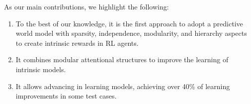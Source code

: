 As our main contributions, we highlight the following:

\begin{enumerate}
    \item To the best of our knowledge, it is the first approach to adopt a predictive world model with sparsity, independence, modularity, and hierarchy aspects to create intrinsic rewards in RL agents.
    \item It combines modular attentional structures to improve the learning of intrinsic models.
    \item It allows advancing in learning models, achieving over 40\% of learning improvements in some test cases.
\end{enumerate}



















